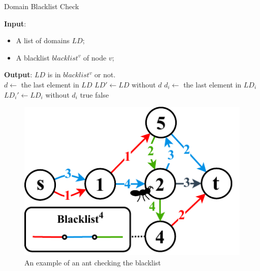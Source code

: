 \bigskip
\begin{algorithm}
	\caption{Domain Blacklist Check}
	\label{alg:blacklist}
	\textbf{Input}:	
	\begin{itemize}
		\item A list of domains $LD$;\\
		\item A blacklist $blacklist^v$ of node $v$;\\
	\end{itemize}
	\textbf{Output}: $LD$ is in $blacklist^v$ or not.\\
	\Begin
	{	
		$d \leftarrow $ the last element in $LD$\;
		$LD' \leftarrow LD$ without $d$\;		
		{
			$d_i \leftarrow $ the last element in $LD_i$\;
			{
				$LD_i' \leftarrow LD_i$ without $d_i$\;
				 {\Return true\;}
			}
		}
		\Return false\;
	}
\end{algorithm}
\bigskip
\setlength{\intextsep}{3pt}
\renewcommand{\scalefigure}{1}
\begin{figure}[htbp]
	\centering
	\includegraphics[scale=\scalefigure]{Figures/chap 3/BlacklistV2.pdf}
	\caption{An example of an ant checking the blacklist}
	\label{fig:blacklist}
\end{figure}
\bigskip
